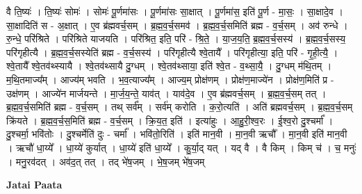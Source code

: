 \documentclass[17pt]{extarticle}
\begin{document}
वै ति॒ष्यः॑ । ति॒ष्यः॑ सोमः॑ । सोमः॑ पू॒र्णमा॑सः । पू॒र्णमा॑सः सा॒क्षात् । पू॒र्णमा॑स॒ इति॑ पू॒र्ण - मा॒सः॒ । सा॒क्षादे॒व । सा॒क्षादिति॑ स - अ॒क्षात् । ए॒व ब्र॑ह्मवर्च॒सम् । ब्र॒ह्म॒व॒र्च॒समव॑ । ब्र॒ह्म॒व॒र्च॒समिति॑ ब्रह्म - व॒र्च॒सम् । अव॑ रुन्धे । रु॒न्धे॒ परि॑श्रिते । परि॑श्रिते याजयति । परि॑श्रित॒ इति॒ परि॑ - श्रि॒ते॒ । या॒ज॒य॒ति॒ ब्र॒ह्म॒व॒र्च॒सस्य॑ । ब्र॒ह्म॒व॒र्च॒सस्य॒ परि॑गृहीत्यै । ब्र॒ह्म॒व॒र्च॒सस्येति॑ ब्रह्म - व॒र्च॒सस्य॑ । परि॑गृहीत्यै श्वे॒तायै᳚ । परि॑गृहीत्या॒ इति॒ परि॑ - गृ॒ही॒त्यै॒ । श्वे॒तायै᳚ श्वे॒तव॑थ्स्यायै । श्वे॒तव॑थ्सायै दु॒ग्धम् । श्वे॒तव॑थ्साया॒ इति॑ श्वे॒त - व॒थ्सा॒यै॒ । दु॒ग्धम् म॑थि॒तम् । म॒थि॒तमाज्य᳚म् । आज्य॑म् भवति । भ॒व॒त्याज्य᳚म् । आज्य॒म् प्रोक्ष॑णम् । प्रोक्ष॑ण॒माज्ये॑न । प्रोक्ष॑ण॒मिति॑ प्र - उक्ष॑णम् । आज्ये॑न मार्जयन्ते । मा॒र्ज॒य॒न्ते॒ याव॑त् । याव॑दे॒व । ए॒व ब्र॑ह्मवर्च॒सम् । ब्र॒ह्म॒व॒र्च॒सम् तत् । ब्र॒ह्म॒व॒र्च॒समिति॑ ब्रह्म - व॒र्च॒सम् । तथ् सर्व᳚म् । सर्व॑म् करोति । क॒रो॒त्यति॑ । अति॑ ब्रह्मवर्च॒सम् । ब्र॒ह्म॒व॒र्च॒सम् क्रि॑यते । ब्र॒ह्म॒व॒र्च॒स॒मिति॑ ब्रह्म - व॒र्च॒सम् । क्रि॒य॒त॒ इति॑ । इत्या॑हुः । आ॒हु॒री॒श्व॒रः । ई॒श्व॒रो दु॒श्चर्मा᳚ । दु॒श्चर्मा॒ भवि॑तोः । दु॒श्चर्मेति॑ दुः - चर्मा᳚ । भवि॑तो॒रिति॑ । इति॑ मान॒वी । मा॒न॒वी ऋचौ᳚ । मा॒न॒वी इति॑ मान॒वी । ऋचौ॑ धा॒य्ये᳚ । धा॒य्ये॑ कुर्यात् । धा॒य्ये॑ इति॑ धा॒य्ये᳚ । कु॒र्या॒द् यत् । 
यद् वै । वै किम् । किम् च॑ । च॒ मनुः॑ । मनु॒रव॑दत् । अव॑द॒त् तत् । तद् भे॑ष॒जम् । भे॒ष॒जम् भे॑ष॒जम् \newline

\textbf{Jatai Paata} \newline
\end{document}
